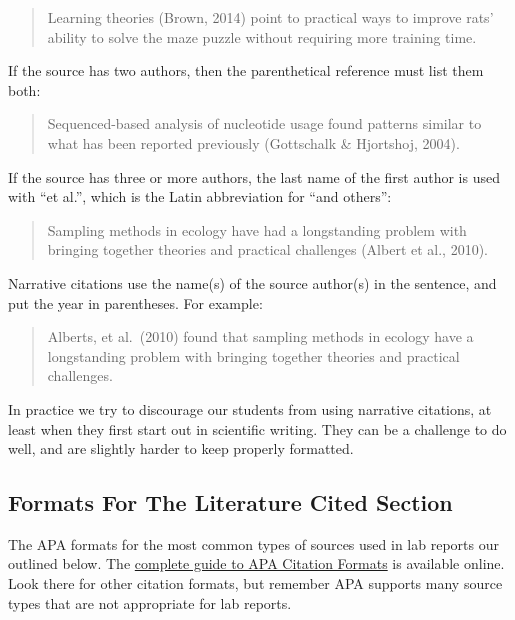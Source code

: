 \documentclass[
]{book}
\begin{document}
\begin{quote}
Learning theories (Brown, 2014) point to practical ways to improve rats' ability to solve the maze puzzle without requiring more training time.
\end{quote}

If the source has two authors, then the parenthetical reference must list them both:

\begin{quote}
Sequenced-based analysis of nucleotide usage found patterns similar to what has been reported previously (Gottschalk \& Hjortshoj, 2004).
\end{quote}

If the source has three or more authors, the last name of the first author is used with ``et al.'', which is the Latin abbreviation for ``and others'':

\begin{quote}
Sampling methods in ecology have had a longstanding problem with bringing together theories and practical challenges (Albert et al., 2010).
\end{quote}

Narrative citations use the name(s) of the source author(s) in the sentence, and put the year in parentheses. For example:

\begin{quote}
Alberts, et al.~(2010) found that sampling methods in ecology have a longstanding problem with bringing together theories and practical challenges.
\end{quote}

In practice we try to discourage our students from using narrative citations, at least when they first start out in scientific writing. They can be a challenge to do well, and are slightly harder to keep properly formatted.

\hypertarget{formats-for-the-literature-cited-section}{%
\subsection{Formats For The Literature Cited Section}\label{formats-for-the-literature-cited-section}}

The APA formats for the most common types of sources used in lab reports our outlined below. The \href{https://apastyle.apa.org/style-grammar-guidelines/references/examples}{complete guide to APA Citation Formats} is available online. Look there for other citation formats, but remember APA supports many source types that are not appropriate for lab reports.
\end{document}
